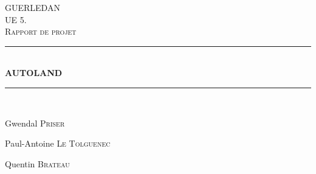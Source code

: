 \documentclass[12pt]{article}
\begin{document}
\begin{titlepage}
\newcommand{\HRule}{\rule{\linewidth}{0.1mm}} 
\center %
 
\textsc{\Large GUERLEDAN}\\[0.5cm] %
\textsc{\Large UE 5.}\\[0.5cm] %
\textsc{\large Rapport de projet}\\[0.5cm] %

\HRule \\[0.4cm]
{ \huge \bfseries AUTOLAND}\\[0.1cm] %
\HRule \\[1.5cm]
 

\begin{minipage}{0.4\textwidth}
\begin{flushleft} \large
Gwendal \textsc{Priser}\\  %
\end{flushleft}

\begin{flushleft} \large
    Paul-Antoine \textsc{Le Tolguenec}\\  %
    \end{flushleft}
   
\end{minipage}
\begin{minipage}{0.4\textwidth}
    \begin{flushleft} \large
        Quentin \textsc{Brateau}\\  %
        \end{flushleft}


\end{minipage}
\end{titlepage}
\end{document}
